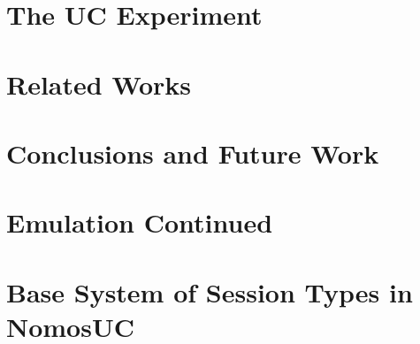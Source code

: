 \documentclass[acmsmall,screen,review,anonymous]{acmart}
\begin{document}
\section{The UC Experiment} \label{sec:execuc}


%

%
%


\section{Related Works} \label{sec:related}


\section{Conclusions and Future Work}





\newpage


\appendix

% 

\section{Emulation Continued} \label{app:emulation}


\section{Base System of Session Types in NomosUC} \label{app:basic}

\end{document}
